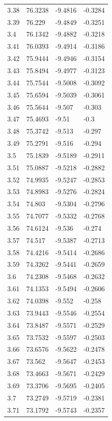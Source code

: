 \begin{tabular}{llll}
3.38 & 76.3238 & -9.4816 & -0.3284 \\
3.39 & 76.229 & -9.4849 & -0.3251 \\
3.4 & 76.1342 & -9.4882 & -0.3218 \\
3.41 & 76.0393 & -9.4914 & -0.3186 \\
3.42 & 75.9444 & -9.4946 & -0.3154 \\
3.43 & 75.8494 & -9.4977 & -0.3123 \\
3.44 & 75.7544 & -9.5008 & -0.3092 \\
3.45 & 75.6594 & -9.5039 & -0.3061 \\
3.46 & 75.5644 & -9.507 & -0.303 \\
3.47 & 75.4693 & -9.51 & -0.3 \\
3.48 & 75.3742 & -9.513 & -0.297 \\
3.49 & 75.2791 & -9.516 & -0.294 \\
3.5 & 75.1839 & -9.5189 & -0.2911 \\
3.51 & 75.0887 & -9.5218 & -0.2882 \\
3.52 & 74.9935 & -9.5247 & -0.2853 \\
3.53 & 74.8983 & -9.5276 & -0.2824 \\
3.54 & 74.803 & -9.5304 & -0.2796 \\
3.55 & 74.7077 & -9.5332 & -0.2768 \\
3.56 & 74.6124 & -9.536 & -0.274 \\
3.57 & 74.517 & -9.5387 & -0.2713 \\
3.58 & 74.4216 & -9.5414 & -0.2686 \\
3.59 & 74.3262 & -9.5441 & -0.2659 \\
3.6 & 74.2308 & -9.5468 & -0.2632 \\
3.61 & 74.1353 & -9.5494 & -0.2606 \\
3.62 & 74.0398 & -9.552 & -0.258 \\
3.63 & 73.9443 & -9.5546 & -0.2554 \\
3.64 & 73.8487 & -9.5571 & -0.2529 \\
3.65 & 73.7532 & -9.5597 & -0.2503 \\
3.66 & 73.6576 & -9.5622 & -0.2478 \\
3.67 & 73.562 & -9.5647 & -0.2453 \\
3.68 & 73.4663 & -9.5671 & -0.2429 \\
3.69 & 73.3706 & -9.5695 & -0.2405 \\
3.7 & 73.2749 & -9.5719 & -0.2381 \\
3.71 & 73.1792 & -9.5743 & -0.2357 \\

\end{tabular}

